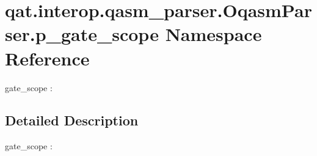 \hypertarget{namespaceqat_1_1interop_1_1qasm__parser_1_1OqasmParser_1_1p__gate__scope}{\section{qat.\-interop.\-qasm\-\_\-parser.\-Oqasm\-Parser.\-p\-\_\-gate\-\_\-scope Namespace Reference}
\label{namespaceqat_1_1interop_1_1qasm__parser_1_1OqasmParser_1_1p__gate__scope}
}


gate\-\_\-scope \-:  




\subsection{Detailed Description}
gate\-\_\-scope \-: 